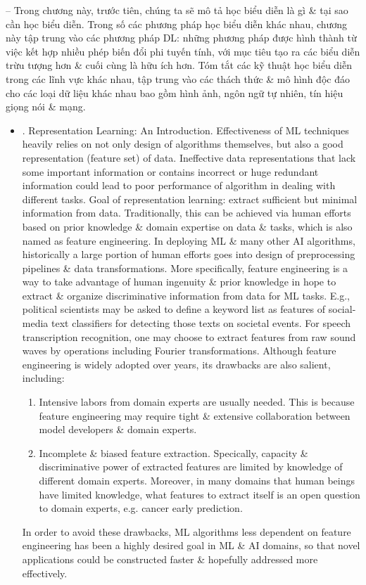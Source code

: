 \documentclass{article}
\begin{document}
\begin{itemize}
    -- Trong chương này, trước tiên, chúng ta sẽ mô tả học biểu diễn là gì \& tại sao cần học biểu diễn. Trong số các phương pháp học biểu diễn khác nhau, chương này tập trung vào các phương pháp DL: những phương pháp được hình thành từ việc kết hợp nhiều phép biến đổi phi tuyến tính, với mục tiêu tạo ra các biểu diễn trừu tượng hơn \& cuối cùng là hữu ích hơn. Tóm tắt các kỹ thuật học biểu diễn trong các lĩnh vực khác nhau, tập trung vào các thách thức \& mô hình độc đáo cho các loại dữ liệu khác nhau bao gồm hình ảnh, ngôn ngữ tự nhiên, tín hiệu giọng nói \& mạng.
    \begin{itemize}
        \item {. Representation Learning: An Introduction.} Effectiveness of ML techniques heavily relies on not only design of algorithms themselves, but also a good representation (feature set) of data. Ineffective data representations that lack some important information or contains incorrect or huge redundant information could lead to poor performance of algorithm in dealing with different tasks. Goal of representation learning: extract sufficient but minimal information from data. Traditionally, this can be achieved via human efforts based on prior knowledge \& domain expertise on data \& tasks, which is also named as feature engineering. In deploying ML \& many other AI algorithms, historically a large portion of human efforts goes into design of preprocessing pipelines \& data transformations. More specifically, feature engineering is a way to take advantage of human ingenuity \& prior knowledge in hope to extract \& organize discriminative information from data for ML tasks. E.g., political scientists may be asked to define a keyword list as features of social-media text classifiers for detecting those texts on societal events. For speech transcription recognition, one may choose to extract features from raw sound waves by operations including Fourier transformations. Although feature engineering is widely adopted over years, its drawbacks are also salient, including:
        \begin{enumerate}
            \item Intensive labors from domain experts are usually needed. This is because feature engineering may require tight \& extensive collaboration between model developers \& domain experts.
            \item Incomplete \& biased feature extraction. Specically, capacity \& discriminative power of extracted features are limited by knowledge of different domain experts. Moreover, in many domains that human beings have limited knowledge, what features to extract itself is an open question to domain experts, e.g. cancer early prediction.
        \end{enumerate}
        In order to avoid these drawbacks, ML algorithms less dependent on feature engineering has been a highly desired goal in ML \& AI domains, so that novel applications could be constructed faster \& hopefully addressed more effectively.


\end{itemize}
\end{itemize}
\end{document}
